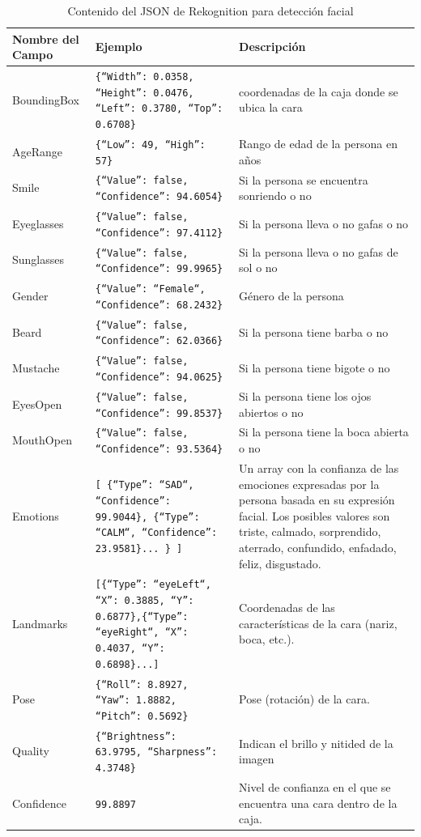 \begin{table}[H]
    \centering
    \begin{tabular}{|p{}|p{}|p{}|}
    \hline
    Nombre del Campo & Ejemplo & Descripción \\ \hline
    BoundingBox & \texttt{\{``Width'': 0.0358, ``Height'': 0.0476, ``Left'': 0.3780, ``Top'': 0.6708\}} & coordenadas de la caja donde se ubica la cara \\ \hline
    AgeRange & \texttt{\{``Low'': 49, ``High'': 57\}} & Rango de edad de la persona en años \\ \hline
    Smile & \texttt{\{``Value'': false, ``Confidence'': 94.6054\}} & Si la persona se encuentra sonriendo o no \\ \hline
    Eyeglasses & \texttt{\{``Value'': false, ``Confidence'': 97.4112\}} & Si la persona lleva o no gafas o no \\ \hline
    Sunglasses & \texttt{\{``Value'': false, ``Confidence'': 99.9965\}} & Si la persona lleva o no gafas de sol o no \\ \hline
    Gender & \texttt{\{``Value'': ``Female``, ``Confidence'': 68.2432\}} & Género de la persona \\ \hline
    Beard & \texttt{\{``Value'': false, ``Confidence'': 62.0366\}} & Si la persona tiene barba o no \\ \hline
    Mustache & \texttt{\{``Value'': false, ``Confidence'': 94.0625\}} & Si la persona tiene bigote o no \\ \hline
    EyesOpen & \texttt{\{``Value'': false, ``Confidence'': 99.8537\}} & Si la persona tiene los ojos abiertos o no \\ \hline
    MouthOpen & \texttt{\{``Value'': false, ``Confidence'': 93.5364\}} & Si la persona tiene la boca abierta o no \\ \hline
    Emotions & \texttt{{[} \{``Type'': ``SAD``, ``Confidence'': 99.9044\}, \{``Type'': ``CALM``, ``Confidence'': 23.9581\}... \} {]}} & Un array con la confianza de las emociones expresadas por la persona basada en su expresión facial. Los posibles valores son triste, calmado, sorprendido, aterrado, confundido, enfadado, feliz, disgustado. \\ \hline
    Landmarks & \texttt{{[}\{``Type'': ``eyeLeft``, ``X'': 0.3885, ``Y'': 0.6877\},\{``Type'': ``eyeRight``, ``X'': 0.4037, ``Y'': 0.6898\}...{]}} & Coordenadas de las características de la cara (nariz, boca, etc.). \\ \hline
    Pose & \texttt{\{``Roll'': 8.8927, ``Yaw'': 1.8882, ``Pitch'': 0.5692\}} & Pose (rotación) de la cara. \\ \hline
    Quality & \texttt{\{``Brightness'': 63.9795, ``Sharpness'': 4.3748\}} & Indican el brillo y nitided de la imagen \\ \hline
    Confidence & \texttt{99.8897} & Nivel de confianza en el que se encuentra una cara dentro de la caja. \\ \hline
    \end{tabular}
    \caption{Contenido del JSON de Rekognition para detección facial}
    \label{tab:json_rekognition}
\end{table}

